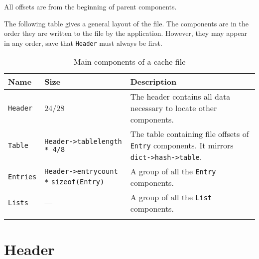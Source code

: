 \documentclass[a4paper,12pt]{article}
\begin{document}
All offsets are from the beginning of parent components.

The following table gives a general layout of the file. The components
are in the order they are written to the file by the
application. However, they may appear in any order, save that \verb#Header#
must always be first.

\begin{longtable}{|p{0.6in}|p{2.3in}|p{2.7in}|}
\hline
{\bf Name} & {\bf Size} & {\bf Description}\\
\hline
\endhead

\verb#Header# & 24/28 & The header contains all data necessary to locate other
components.

\\
\hline

\verb#Table# & \verb#Header->tablelength * 4/8# & The table containing
file offsets of \verb#Entry# components. It mirrors
\verb#dict->hash->table#.

\\
\hline

\verb#Entries# & \verb#Header->entrycount *# \verb#sizeof(Entry)# & A group of all the
\verb#Entry# components.

\\
\hline

\verb#Lists# & --- & A group of all the \verb#List# components.

\\
\hline
\caption{Main components of a cache file}
\end{longtable}



\section{Header}
\end{document}

